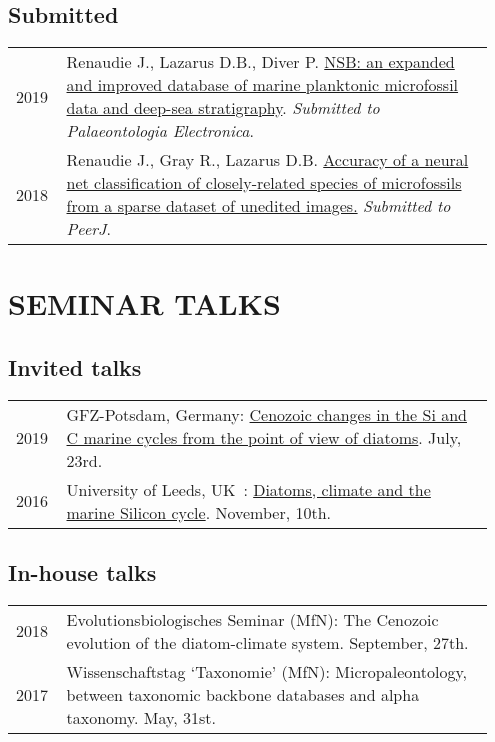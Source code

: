 \documentclass[11pt, a4paper]{article}
\begin{document}
\subsection{Submitted}
\begin{longtable}{p{0.1\linewidth} P{0.85\linewidth}}
2019 & Renaudie J., Lazarus D.B., Diver P. \href{https://eartharxiv.org/97se5/}{NSB: an expanded and improved database of marine planktonic microfossil data and deep-sea stratigraphy}. \textit{Submitted to Palaeontologia Electronica}.\\
2018 & Renaudie J., Gray R., Lazarus D.B. \href{https://peerj.com/preprints/27328/}{Accuracy of a neural net classification of closely-related species of microfossils from a sparse dataset of unedited images.} \textit{Submitted to PeerJ}.\\
\end{longtable}

\section{SEMINAR TALKS}
\subsection{Invited talks}
\begin{longtable}{p{0.1\linewidth} P{0.85\linewidth}}
2019 %
 & GFZ-Potsdam, Germany: \href{http://plannapus.github.io/data/20190723Potsdam.pdf}{Cenozoic changes in the Si and C marine cycles from the point of view of diatoms}. July, 23rd.\\
2016 & University of Leeds, UK : \href{http://www.see.leeds.ac.uk/research/iag/geoscience-seminars/event/?SemID=534}{Diatoms, climate and the marine Silicon cycle}. November, 10th.\\
\end{longtable}
\subsection{In-house talks}
\begin{longtable}{p{0.1\linewidth} P{0.85\linewidth}}
2018 & Evolutionsbiologisches Seminar (MfN): The Cenozoic evolution of the diatom-climate system. September, 27th.\\
2017 & Wissenschaftstag `Taxonomie' (MfN): Micropaleontology, between taxonomic backbone databases and alpha taxonomy. May, 31st.\\
\end{longtable}
\end{document}
